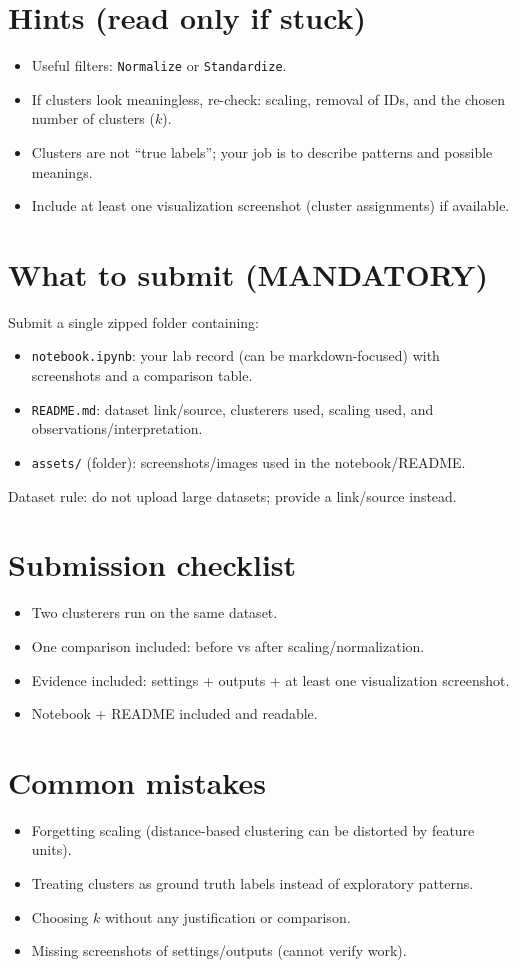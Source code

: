 \documentclass[11pt]{article}
\begin{document}
\section{Hints (read only if stuck)}
\begin{itemize}[leftmargin=*]
  \item Useful filters: \texttt{Normalize} or \texttt{Standardize}.
  \item If clusters look meaningless, re-check: scaling, removal of IDs, and the chosen number of clusters ($k$).
  \item Clusters are not ``true labels''; your job is to describe patterns and possible meanings.
  \item Include at least one visualization screenshot (cluster assignments) if available.
\end{itemize}

\section{What to submit (MANDATORY)}
Submit a single zipped folder containing:
\begin{itemize}[leftmargin=*]
  \item \texttt{notebook.ipynb}: your lab record (can be markdown-focused) with screenshots and a comparison table.
  \item \texttt{README.md}: dataset link/source, clusterers used, scaling used, and observations/interpretation.
  \item \texttt{assets/} (folder): screenshots/images used in the notebook/README.
\end{itemize}
Dataset rule: do not upload large datasets; provide a link/source instead.

\section{Submission checklist}
\begin{itemize}[leftmargin=*]
  \item Two clusterers run on the same dataset.
  \item One comparison included: before vs after scaling/normalization.
  \item Evidence included: settings + outputs + at least one visualization screenshot.
  \item Notebook + README included and readable.
\end{itemize}

\section{Common mistakes}
\begin{itemize}[leftmargin=*]
  \item Forgetting scaling (distance-based clustering can be distorted by feature units).
  \item Treating clusters as ground truth labels instead of exploratory patterns.
  \item Choosing $k$ without any justification or comparison.
  \item Missing screenshots of settings/outputs (cannot verify work).
\end{itemize}

\notesources{\AIMLLabSources}
\end{document}
